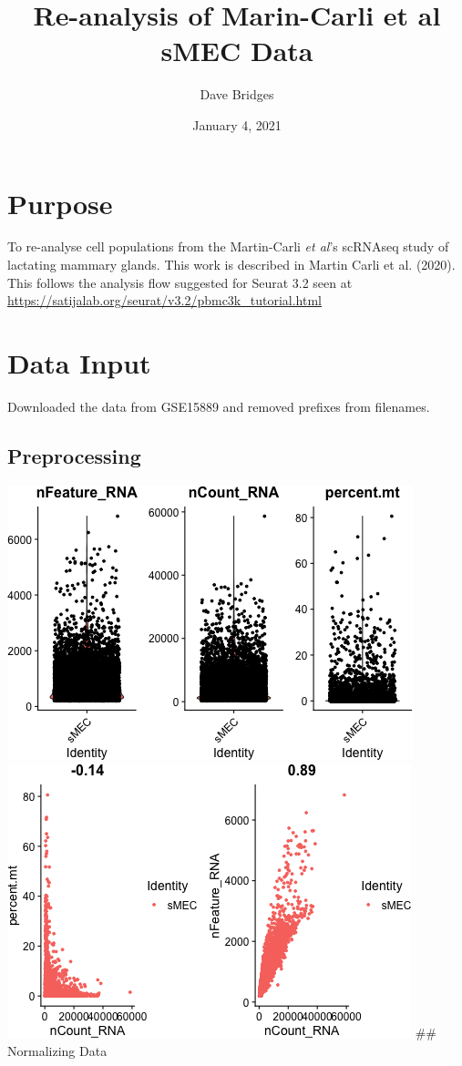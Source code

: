 \documentclass[]{article}
\title{Re-analysis of Marin-Carli et al sMEC Data}
\author{Dave Bridges}
\date{January 4, 2021}
\begin{document}
\maketitle

{
\setcounter{tocdepth}{2}
\tableofcontents
}
\hypertarget{purpose}{%
\section{Purpose}\label{purpose}}

To re-analyse cell populations from the Martin-Carli \emph{et al}'s
scRNAseq study of lactating mammary glands. This work is described in
Martin Carli et al. (2020). This follows the analysis flow suggested for
Seurat 3.2 seen at
\url{https://satijalab.org/seurat/v3.2/pbmc3k_tutorial.html}

\hypertarget{data-input}{%
\section{Data Input}\label{data-input}}

Downloaded the data from GSE15889 and removed prefixes from filenames.

\hypertarget{preprocessing}{%
\subsection{Preprocessing}\label{preprocessing}}

\includegraphics{figures/pre-processing-1.png}
\includegraphics{figures/pre-processing-2.png} \#\# Normalizing Data
\end{document}

